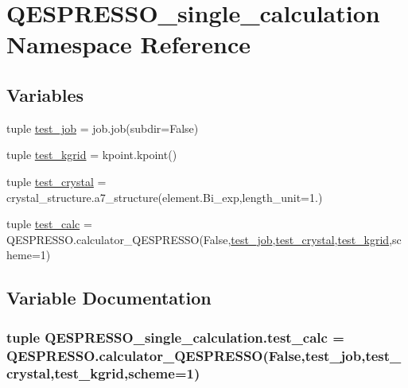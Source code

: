 \hypertarget{namespace_q_e_s_p_r_e_s_s_o__single__calculation}{\section{Q\+E\+S\+P\+R\+E\+S\+S\+O\+\_\+single\+\_\+calculation Namespace Reference}
\label{namespace_q_e_s_p_r_e_s_s_o__single__calculation}
}
\subsection*{Variables}
\begin{DoxyCompactItemize}
\item 
tuple \hyperlink{namespace_q_e_s_p_r_e_s_s_o__single__calculation_a0aec7de6320a65be3f19d8d0653735bf}{test\+\_\+job} = job.\+job(subdir=False)
\item 
tuple \hyperlink{namespace_q_e_s_p_r_e_s_s_o__single__calculation_a7968ed452bf455990eab8181fa5cb393}{test\+\_\+kgrid} = kpoint.\+kpoint()
\item 
tuple \hyperlink{namespace_q_e_s_p_r_e_s_s_o__single__calculation_a2cc42834e4bbe26321c1db9ae0912a07}{test\+\_\+crystal} = crystal\+\_\+structure.\+a7\+\_\+structure(element.\+Bi\+\_\+exp,length\+\_\+unit=1.)
\item 
tuple \hyperlink{namespace_q_e_s_p_r_e_s_s_o__single__calculation_a107caeca4b6f9898fa3f3813ef23370c}{test\+\_\+calc} = Q\+E\+S\+P\+R\+E\+S\+S\+O.\+calculator\+\_\+\+Q\+E\+S\+P\+R\+E\+S\+S\+O(False,\hyperlink{namespace_q_e_s_p_r_e_s_s_o__single__calculation_a0aec7de6320a65be3f19d8d0653735bf}{test\+\_\+job},\hyperlink{namespace_q_e_s_p_r_e_s_s_o__single__calculation_a2cc42834e4bbe26321c1db9ae0912a07}{test\+\_\+crystal},\hyperlink{namespace_q_e_s_p_r_e_s_s_o__single__calculation_a7968ed452bf455990eab8181fa5cb393}{test\+\_\+kgrid},scheme=1)
\end{DoxyCompactItemize}


\subsection{Variable Documentation}
\hypertarget{namespace_q_e_s_p_r_e_s_s_o__single__calculation_a107caeca4b6f9898fa3f3813ef23370c}{
\subsubsection[{test\+\_\+calc}]{\setlength{\rightskip}{0pt plus 5cm}tuple Q\+E\+S\+P\+R\+E\+S\+S\+O\+\_\+single\+\_\+calculation.\+test\+\_\+calc = Q\+E\+S\+P\+R\+E\+S\+S\+O.\+calculator\+\_\+\+Q\+E\+S\+P\+R\+E\+S\+S\+O(False,{\bf test\+\_\+job},{\bf test\+\_\+crystal},{\bf test\+\_\+kgrid},scheme=1)}}\label{namespace_q_e_s_p_r_e_s_s_o__single__calculation_a107caeca4b6f9898fa3f3813ef23370c}



